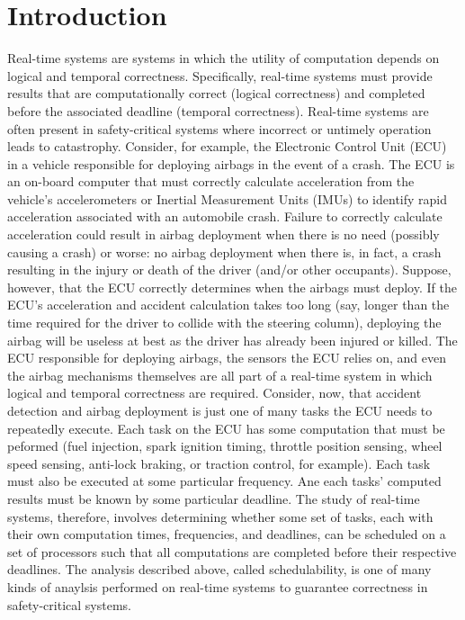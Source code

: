 \section{Introduction}   \label{chap:introduction}


Real-time systems are systems in which the utility of computation depends on logical and temporal correctness.
Specifically, real-time systems must provide results that are computationally correct (logical correctness) and completed before the associated deadline (temporal correctness).
Real-time systems are often present in safety-critical systems where incorrect or untimely operation leads to catastrophy.
Consider, for example, the Electronic Control Unit (ECU) in a vehicle responsible for deploying airbags in the event of a crash.
The ECU is an on-board computer that must correctly calculate acceleration from the vehicle's accelerometers or Inertial Measurement Units (IMUs) to identify rapid acceleration associated with an automobile crash.
Failure to correctly calculate acceleration could result in airbag deployment when there is no need (possibly causing a crash) or worse: no airbag deployment when there is, in fact, a crash resulting in the injury or death of the driver (and/or other occupants).
Suppose, however, that the ECU correctly determines when the airbags must deploy.
If the ECU's acceleration and accident calculation takes too long (say, longer than the time required for the driver to collide with the steering column), deploying the airbag will be useless at best as the driver has already been injured or killed.
The ECU responsible for deploying airbags, the sensors the ECU relies on, and even the airbag mechanisms themselves are all part of a real-time system in which logical and temporal correctness are required.
Consider, now, that accident detection and airbag deployment is just one of many tasks the ECU needs to repeatedly execute.
Each task on the ECU has some computation that must be peformed (fuel injection, spark ignition timing, throttle position sensing, wheel speed sensing, anti-lock braking, or traction control, for example).
Each task must also be executed at some particular frequency.
Ane each tasks' computed results must be known by some particular deadline.
The study of real-time systems, therefore, involves determining whether some set of tasks, each with their own computation times, frequencies, and deadlines, can be scheduled on a set of processors such that all computations are completed before their respective deadlines.
The analysis described above, called schedulability, is one of many kinds of anaylsis performed on real-time systems to guarantee correctness in safety-critical systems.

